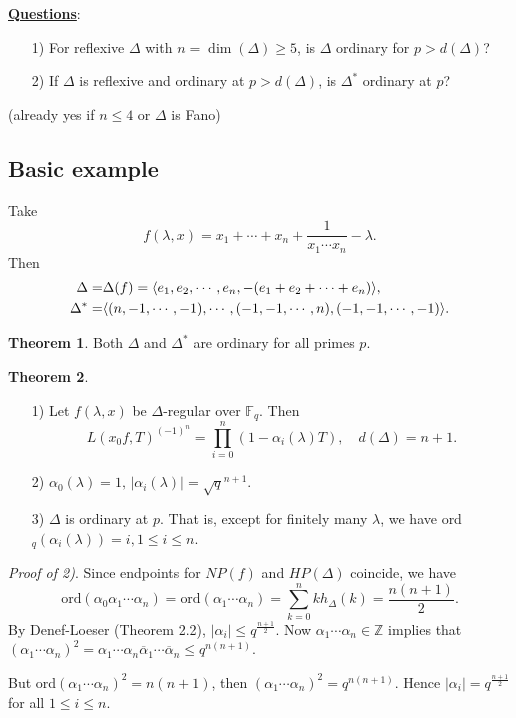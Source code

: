 \documentclass[a4paper,oneside,11pt]{article}
\theoremstyle{plain} \theoremstyle{definition}
\newtheorem{Thm}{Theorem}[section]
\theoremstyle{remark}
\newcommand{\Z}{\mathbb{Z}}
\newcommand{\f}{\mathbb{F}}
\begin{document}
\underline{\bf Questions}:\begin{enumerate}\item[1)]For reflexive
$\Delta$ with $n=\dim(\Delta)\ge 5$, is $\Delta$ ordinary for
$p>d(\Delta)$?\item[2)]If $\Delta$ is reflexive and ordinary at
$p>d(\Delta)$, is $\Delta^*$ ordinary at $p$?\end{enumerate}
(already yes if $n\leq 4$ or $\Delta$ is Fano)

\subsection{Basic example}
Take$$f(\lambda,x)=x_1+\cdots+x_n+\frac{1}{x_1\cdots
x_n}-\lambda.$$ Then
$$\aligned
\Delta=&\Delta(f)=\langle e_1,e_2,\cdots,e_n,-(e_1+e_2+\cdots+e_n)\rangle,\\
\Delta^*=&\langle(n,-1,\cdots,-1),\cdots,(-1,-1,\cdots,n),(-1,-1,\cdots,-1)\rangle.\endaligned$$

\begin{Thm} Both $\Delta$ and $\Delta^*$ are ordinary for all primes $p$.
\end{Thm}


\begin{Thm}\begin{enumerate}\item[1)] Let $f(\lambda,x)$ be
$\Delta$-regular over $\f_q$. Then
$$L(x_0f,T)^{(-1)^n}=\prod_{i=0}^n(1-\alpha_i(\lambda)T),\quad
d(\Delta)=n+1.$$ \item[2)] $\alpha_0(\lambda)=1,\,
|\alpha_i(\lambda)|=\sqrt{q}^{n+1}$.\item[3)] $\Delta$ is ordinary
at $p$. That is, except for finitely many $\lambda$, we have
ord$_q(\alpha_i(\lambda))=i, 1\le i\le n$.
\end{enumerate}
\end{Thm}
\noindent\emph{Proof of 2)}. \quad Since endpoints for $NP(f)$ and
$HP(\Delta)$ coincide, we have
$$\text{ord}(\alpha_0\alpha_1\cdots \alpha_n)=
\text{ord}(\alpha_1\cdots
\alpha_n)=\sum_{k=0}^nkh_\Delta(k)=\frac{n(n+1)}{2}.$$ By
Denef-Loeser (Theorem 2.2), $|\alpha_i|\le q^{\frac{n+1}{2}}$. Now
$\alpha_1\cdots \alpha_n\in\Z$ implies that $(\alpha_1\cdots
\alpha_n)^2=\alpha_1\cdots \alpha_n\overline{\alpha}_1\cdots
\overline{\alpha}_n\le q^{n(n+1)}$.

But ord$(\alpha_1\cdots \alpha_n)^2=n(n+1)$, then $(\alpha_1\cdots
\alpha_n)^2=q^{n(n+1)}$. Hence $|\alpha_i|=q^{\frac{n+1}{2}}$ for
all $1\le i\le n$.\vskip 5mm
\end{document}
